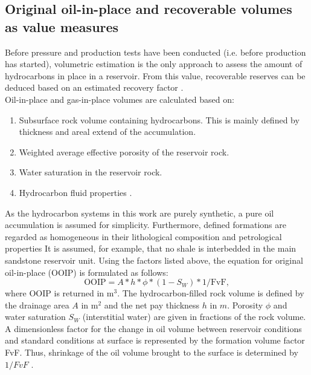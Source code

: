         \subsection{Original oil-in-place and recoverable volumes as value measures}
        Before pressure and production tests have been conducted (i.e. before production has started), volumetric estimation is the only approach to assess the amount of hydrocarbons in place in a reservoir. From this value, recoverable reserves can be deduced based on an estimated recovery factor \citep{dean2007volumetric, morton1993development}.\\
        Oil-in-place and gas-in-place volumes are calculated based on:
        \begin{enumerate}
        \item Subsurface rock volume containing hydrocarbons. This is mainly defined by thickness and areal extend of the accumulation.
        \item Weighted average effective porosity of the reservoir rock.
        \item Water saturation in the reservoir rock.
        \item Hydrocarbon fluid properties \citep{dean2007volumetric, morton1993development}.
        \end{enumerate}
        As the hydrocarbon systems in this work are purely synthetic, a pure oil accumulation is assumed for simplicity. Furthermore, defined formations are regarded as homogeneous in their lithological composition and petrological properties It is assumed, for example, that no shale is interbedded in the main sandstone reservoir unit. Using the factors listed above, the equation for original oil-in-place (OOIP) is formulated as follows:
        \begin{equation}\label{eq:OOIP}
        \text{OOIP} = A * h * \phi * (1 - S_W) * 1/\text{FvF},
        \end{equation}
        where OOIP is returned in m$^3$. The hydrocarbon-filled rock volume is defined by the drainage area $A$ in m$^2$ and the net pay thickness $h$ in $m$. Porosity $\phi$ and water saturation $S_W$ (interstitial water) are given in fractions of the rock volume. A dimensionless factor for the change in oil volume between reservoir conditions and standard conditions at surface is represented by the formation volume factor FvF. Thus, shrinkage of the oil volume brought to the surface is determined by $1/FvF$ \citep{dean2007volumetric, morton1993development}.\\
